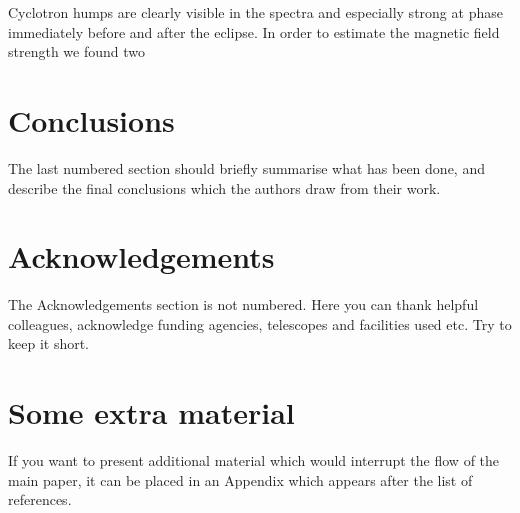 \documentclass[a4paper,fleqn,usenatbib]{mnras}
\begin{document}
Cyclotron humps are clearly visible in the spectra and especially strong at phase immediately before and after the eclipse. In order to estimate the magnetic field strength we found two 

\section{Conclusions}

The last numbered section should briefly summarise what has been done, and describe
the final conclusions which the authors draw from their work.

\section*{Acknowledgements}

The Acknowledgements section is not numbered. Here you can thank helpful
colleagues, acknowledge funding agencies, telescopes and facilities used etc.
Try to keep it short.










\appendix

\section{Some extra material}

If you want to present additional material which would interrupt the flow of the main paper,
it can be placed in an Appendix which appears after the list of references.



\bsp	%
\label{lastpage}
\end{document}
